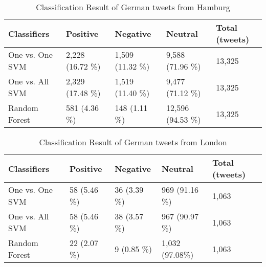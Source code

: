 \begin{table}[ht]
	\caption{Classification Result of German tweets from Hamburg}
	\begin{tabular}{|l|p{1.8cm}|p{1.8cm}|p{1.8cm}|p{1.8cm}|} \hline
	Classifiers & Positive & Negative & Neutral & Total (tweets)\\ \hline
One vs. One SVM & 2,228 (16.72 \%)& 1,509 \newline(11.32 \%) & 9,588 (71.96 \%) & 13,325 \\ \hline
One vs. All SVM & 2,329 \newline(17.48 \%) & 1,519 \newline(11.40 \%) & 9,477 (71.12 \%) & 13,325\\ \hline
Random Forest   & 581 \newline(4.36 \%) & 148 \newline(1.11 \%)  & 12,596 (94.53 \%) & 13,325\\ \hline
	\end{tabular}
	\label{tab:result_hamburg_de}
\end{table}

\begin{table}[ht]
	\caption{Classification Result of German tweets from London}
	\begin{tabular}{|l|p{1.8cm}|p{1.8cm}|p{1.8cm}|p{1.8cm}|} \hline
	Classifiers & Positive & Negative & Neutral & Total (tweets)\\ \hline
	
One vs. One SVM & 58 \newline(5.46 \%)& 36 \newline(3.39 \%)& 969 \newline(91.16 \%) & 1,063 \\ \hline
One vs. All SVM & 58 \newline(5.46 \%)& 38 \newline(3.57 \%)& 967  \newline(90.97 \%)& 1,063 \\ \hline
Random Forest   & 22 \newline(2.07 \%)& 9 \newline(0.85 \%) & 1,032 (97.08\%)& 1,063 \\ \hline

	\end{tabular}
	\label{tab:result_london_de}
\end{table}

